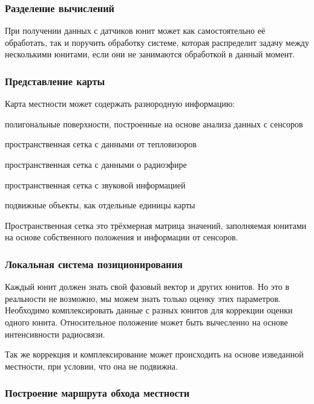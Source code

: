 \subsubsection{Разделение вычислений}

При получении данных с датчиков юнит может как самостоятельно
её обработать, так и поручить обработку системе, которая
распределит задачу между несколькими юнитами, если они не
занимаются обработкой в данный момент.

\subsubsection{Представление карты}

Карта местности может содержать разнородную информацию:
\begin{mintemize}
    \item полигональные поверхности, построенные на основе анализа
        данных с сенсоров
    \item пространственная сетка с данными от тепловизоров
    \item пространственная сетка с данными о радиоэфире
    \item пространственная сетка с звуковой информацией
    \item подвижные объекты, как отдельные единицы карты
\end{mintemize}

Пространственная сетка это трёхмерная матрица значений, заполняемая
юнитами на основе собственного положения и информации от сенсоров.

\subsubsection{Локальная система позиционирования}

Каждый юнит должен знать свой фазовый вектор и других юнитов.
Но это в реальности не возможно, мы можем знать только
оценку этих параметров. Необходимо комплексировать данные с разных
юнитов для коррекции оценки одного юнита. Относительное положение
может быть вычесленно на основе интенсивности радиосвязи.

Так же коррекция и комплексирование может происходить на основе
изведанной местности, при условии, что она не подвижна.

\subsubsection{Построение маршрута обхода местности}

